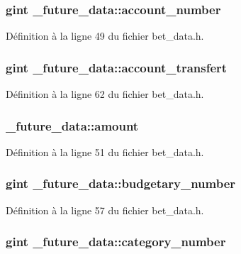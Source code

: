 \subsubsection[{account\_\-number}]{\setlength{\rightskip}{0pt plus 5cm}gint {\bf \_\-future\_\-data::account\_\-number}}\label{struct__future__data_aec6e59fe50ac1f8b16494f1eb9c3ce08}


Définition à la ligne 49 du fichier bet\_\-data.h.

\subsubsection[{account\_\-transfert}]{\setlength{\rightskip}{0pt plus 5cm}gint {\bf \_\-future\_\-data::account\_\-transfert}}\label{struct__future__data_af83878f06d5b952670835f6d80ba9726}


Définition à la ligne 62 du fichier bet\_\-data.h.

\subsubsection[{amount}]{ {\bf \_\-future\_\-data::amount}}\label{struct__future__data_ab6a468f4764512e715d9000a2a7086df}


Définition à la ligne 51 du fichier bet\_\-data.h.

\subsubsection[{budgetary\_\-number}]{\setlength{\rightskip}{0pt plus 5cm}gint {\bf \_\-future\_\-data::budgetary\_\-number}}\label{struct__future__data_a9286325fd1c8341632c6984a360e7d65}


Définition à la ligne 57 du fichier bet\_\-data.h.

\subsubsection[{category\_\-number}]{\setlength{\rightskip}{0pt plus 5cm}gint {\bf \_\-future\_\-data::category\_\-number}}\label{struct__future__data_afb745c743998073de41000fce3d45378}


